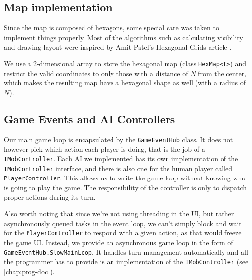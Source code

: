 \subsection{Map implementation}

Since the map is composed of hexagons, some special care was taken to implement things properly. Most of the algorithms such as calculating visibility and drawing layout were inspired by Amit Patel's Hexagonal Grids article \citep{hexagons}.

We use a 2-dimensional array to store the hexagonal map (class \verb|HexMap<T>|) and restrict the valid coordinates to only those with a distance of $N$ from the center, which makes the resulting map have a hexagonal shape as well (with a radius of $N$).

\subsection{Game Events and AI Controllers}

Our main game loop is encapsulated by the \verb|GameEventHub| class. It does not however pick which action each player is doing, that is the job of a \verb|IMobController|. Each AI we implemented has its own implementation of the \verb|IMobController| interface, and there is also one for the human player called \verb|PlayerController|. This allows us to write the game loop without knowing who is going to play the game. The responsibility of the controller is only to dispatch proper actions during its turn.

Also worth noting that since we're not using threading in the UI, but rather asynchronously queued tasks in the event loop, we can't simply block and wait for the \verb|PlayerController| to respond with a given action, as that would freeze the game UI. Instead, we provide an asynchronous game loop in the form of \verb|GameEventHub.SlowMainLoop|. It handles turn management automatically and all the programmer has to provide is an implementation of the \verb|IMobController| (see \autoref{chap:prog-doc}).
